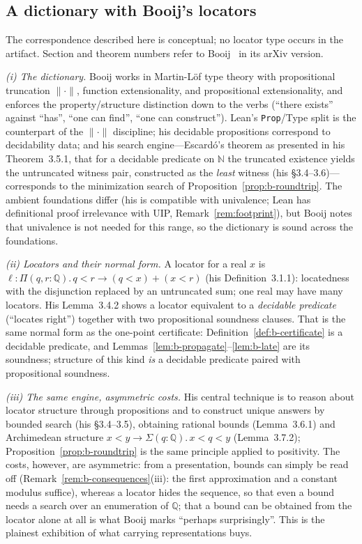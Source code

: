 \documentclass[11pt]{article}
\theoremstyle{definition}
\theoremstyle{remark}
\begin{document}
\subsection{A dictionary with Booij's locators}
\label{sec:b-booij}

The correspondence described here is conceptual; no locator type occurs in the artifact.  Section and theorem numbers refer to Booij~\cite{booij-2021} in its arXiv version.

\emph{(i) The dictionary.}  Booij works in Martin-L\"of type theory with propositional truncation $\lVert\cdot\rVert$, function extensionality, and propositional extensionality, and enforces the property/structure distinction down to the verbs (``there exists'' against ``has'', ``one can find'', ``one can construct'').  Lean's \texttt{Prop}/Type split is the counterpart of the $\lVert\cdot\rVert$ discipline; his decidable propositions correspond to decidability data; and his search engine---Escard\'o's theorem as presented in his Theorem~3.5.1, that for a decidable predicate on $\mathbb{N}$ the truncated existence yields the untruncated witness pair, constructed as the \emph{least} witness (his \S3.4--3.6)---corresponds to the minimization search of Proposition~\ref{prop:b-roundtrip}.  The ambient foundations differ (his is compatible with univalence; Lean has definitional proof irrelevance with UIP, Remark~\ref{rem:footprint}), but Booij notes that univalence is not needed for this range, so the dictionary is sound across the foundations.

\emph{(ii) Locators and their normal form.}  A locator for a real $x$ is
\(
\ell:\Pi(q,r:\mathbb{Q}).\,q<r\to(q<x)+(x<r)
\)
(his Definition~3.1.1): locatedness with the disjunction replaced by an untruncated sum; one real may have many locators.  His Lemma~3.4.2 shows a locator equivalent to a \emph{decidable predicate} (``locates right'') together with two propositional soundness clauses.  That is the same normal form as the one-point certificate: Definition~\ref{def:b-certificate} is a decidable predicate, and Lemmas~\ref{lem:b-propagate}--\ref{lem:b-late} are its soundness; structure of this kind \emph{is} a decidable predicate paired with propositional soundness.

\emph{(iii) The same engine, asymmetric costs.}  His central technique is to reason about locator structure through propositions and to construct unique answers by bounded search (his \S3.4--3.5), obtaining rational bounds (Lemma~3.6.1) and Archimedean structure $x<y\to\Sigma(q:\mathbb{Q}).\,x<q<y$ (Lemma~3.7.2); Proposition~\ref{prop:b-roundtrip} is the same principle applied to positivity.  The costs, however, are asymmetric: from a presentation, bounds can simply be read off (Remark~\ref{rem:b-consequences}(iii): the first approximation and a constant modulus suffice), whereas a locator hides the sequence, so that even a bound needs a search over an enumeration of $\mathbb{Q}$; that a bound can be obtained from the locator alone at all is what Booij marks ``perhaps surprisingly''.  This is the plainest exhibition of what carrying representations buys.
\end{document}
